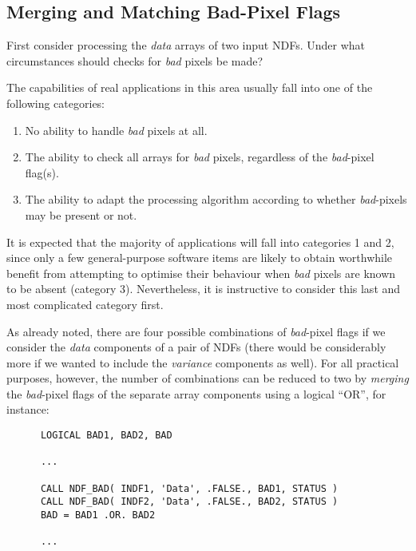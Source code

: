 \documentclass[twoside,11pt]{article}
\newcommand{\xlabel}[1]{}
\newcommand{\st}[1]{{\em{#1}}}
\begin{document}
\subsection{\xlabel{merging_and_matching_bad-pixel_flags}\label{ss:mbad}Merging and Matching Bad-Pixel Flags}

First consider processing the \st{data\/} arrays of two input NDFs.
Under what circumstances should checks for \st{bad\/} pixels be made? 

The capabilities of real applications in this area usually fall into one of
the following categories: 

\begin{enumerate}

\item No ability to handle \st{bad\/} pixels at all.

\item The ability to check all arrays for \st{bad\/} pixels, regardless of
the \st{bad\/}-pixel flag(s). 

\item The ability to adapt the processing algorithm according to whether
\st{bad\/}-pixels may be present or not. 

\end{enumerate}

It is expected that the majority of applications will fall into categories 1
and 2, since only a few general-purpose software items are likely to obtain
worthwhile benefit from attempting to optimise their behaviour when
\st{bad\/} pixels are known to be absent (category 3).  
Nevertheless, it is instructive to consider this last and most complicated
category first. 

As already noted, there are four possible combinations of \st{bad\/}-pixel
flags if we consider the \st{data\/} components of a pair of NDFs (there
would be considerably more if we wanted to include the \st{variance\/}
components as well). 
For all practical purposes, however, the number of combinations can be
reduced to two by \st{merging\/} the \st{bad\/}-pixel flags of the separate 
array components using a logical ``OR'', for instance: 

\small
\begin{verbatim}
      LOGICAL BAD1, BAD2, BAD

      ...

      CALL NDF_BAD( INDF1, 'Data', .FALSE., BAD1, STATUS )
      CALL NDF_BAD( INDF2, 'Data', .FALSE., BAD2, STATUS )
      BAD = BAD1 .OR. BAD2

      ...
\end{verbatim}
\normalsize
\end{document}
